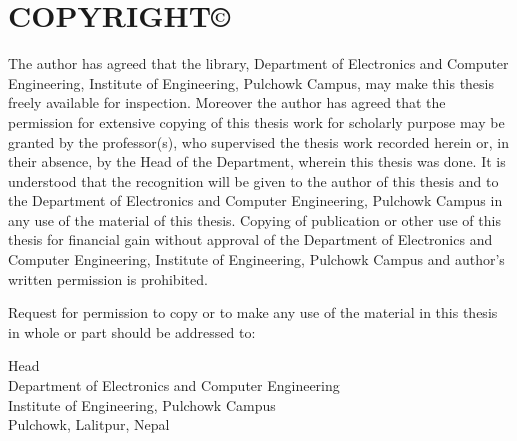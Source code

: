 \setcounter{page}{3}
\chapter*{COPYRIGHT\copyright}
The author has agreed that the library, Department of Electronics and Computer
Engineering, Institute of Engineering, Pulchowk Campus, may make this thesis freely
available for inspection. Moreover the author has agreed that the permission for
extensive copying of this thesis work for scholarly purpose may be granted by the
professor(s), who supervised the thesis work recorded herein or, in their absence, by
the Head of the Department, wherein this thesis was done. It is understood that the
recognition will be given to the author of this thesis and to the Department of
Electronics and Computer Engineering, Pulchowk Campus in any use of the material
of this thesis. Copying of publication or other use of this thesis for financial gain
without approval of the Department of Electronics and Computer Engineering,
Institute of Engineering, Pulchowk Campus and author's written permission is
prohibited.\par
Request for permission to copy or to make any use of the material in this thesis in
whole or part should be addressed to:\par
\vspace{1.5cm}
Head\\
Department of Electronics and Computer Engineering\\
Institute of Engineering, Pulchowk Campus\\
Pulchowk, Lalitpur, Nepal
\newpage
